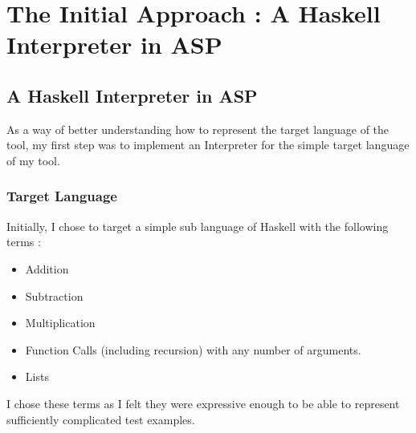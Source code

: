 \chapter{The Initial Approach : A Haskell Interpreter in ASP}

\section{A Haskell Interpreter in ASP}

As a way of better understanding how to represent the target language of the tool, my first step was to implement an Interpreter for the simple target language of my tool.

\subsection{Target Language}

Initially, I chose to target a simple sub language of Haskell with the following terms :

\begin{itemize}
\item Addition
\item Subtraction
\item Multiplication
\item Function Calls (including recursion) with any number of arguments.
\item Lists
\end{itemize}

I chose these terms as I felt they were expressive enough to be able to represent sufficiently complicated test examples.\\ \\


